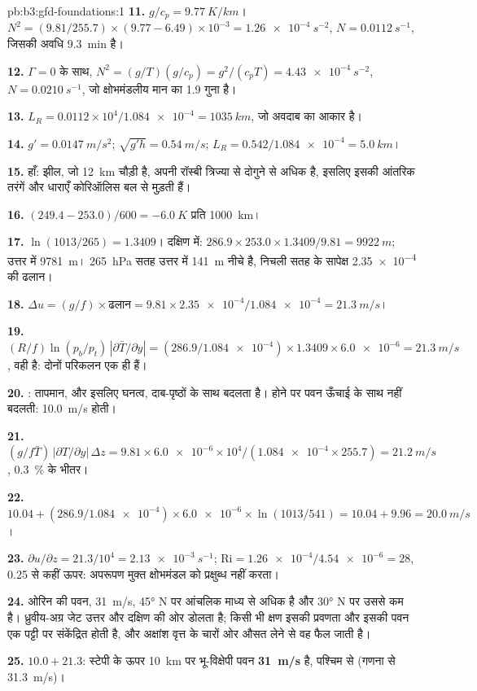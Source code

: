 \begin{solution}{pb:b3:gfd-foundations:1}
\textbf{11.} $g/c_p = \qty{9.77}{K/km}$। $N^2 = (9.81/255.7)\times(9.77 -
6.49)\times10^{-3} = \qty{1.26e-4}{s^{-2}}$, $N = \qty{0.0112}{s^{-1}}$, जिसकी
अवधि \qty{9.3}{min} है।

\textbf{12.} $\Gamma = 0$ के साथ, $N^2 = (g/T)(g/c_p) = g^2/(c_pT) =
\qty{4.43e-4}{s^{-2}}$, $N = \qty{0.0210}{s^{-1}}$, जो
क्षोभमंडलीय मान का 1.9 गुना है।

\textbf{13.} $L_R = 0.0112\times10^4/\num{1.084e-4} = \qty{1035}{km}$, जो
अवदाब का आकार है।

\textbf{14.} $g' = \qty{0.0147}{m/s^2}$; $\sqrt{g'h} = \qty{0.54}{m/s}$;
$L_R = 0.542/\num{1.084e-4} = \qty{5.0}{km}$।

\textbf{15.} हाँ: झील, जो \qty{12}{km} चौड़ी है, अपनी
रॉस्बी त्रिज्या से दोगुने से अधिक है, इसलिए इसकी आंतरिक तरंगें और धाराएँ
कोरिऑलिस बल से मुड़ती हैं।

\textbf{16.} $(249.4 - 253.0)/600 = \qty{-6.0}{K}$ प्रति \qty{1000}{km}।

\textbf{17.} $\ln(1013/265) = 1.3409$। दक्षिण में:
$286.9\times253.0\times1.3409/9.81 = \qty{9922}{m}$; उत्तर में \qty{9781}{m}।
\qty{265}{hPa} सतह उत्तर में \qty{141}{m} नीचे है, निचली सतह के सापेक्ष
\num{2.35e-4} की ढलान।

\textbf{18.} $\Delta u = (g/f)\times\text{ढलान} = 9.81\times\num{2.35e-4}/
\num{1.084e-4} = \qty{21.3}{m/s}$।

\textbf{19.} $(R/f)\ln(p_b/p_t)\,|\partial\bar T/\partial y| =
(286.9/\num{1.084e-4})\times1.3409\times\num{6.0e-6} = \qty{21.3}{m/s}$, वही
है: दोनों परिकलन एक ही हैं।

\textbf{20.} : तापमान, और इसलिए घनत्व, दाब-पृष्ठों के
साथ बदलता है।  होने पर पवन ऊँचाई के साथ नहीं बदलती:
\qty{10.0}{m/s} होती।

\textbf{21.} $(g/f\bar T)\,|\partial T/\partial y|\,\Delta z = 9.81\times
\num{6.0e-6}\times10^4/(\num{1.084e-4}\times255.7) = \qty{21.2}{m/s}$,
\qty{0.3}{\percent} के भीतर।

\textbf{22.} $10.04 + (286.9/\num{1.084e-4})\times\num{6.0e-6}\times
\ln(1013/541) = 10.04 + 9.96 = \qty{20.0}{m/s}$।

\textbf{23.} $\partial u/\partial z = 21.3/10^4 = \qty{2.13e-3}{s^{-1}}$;
$\mathrm{Ri} = \num{1.26e-4}/\num{4.54e-6} = 28$, 0.25 से कहीं ऊपर: अपरूपण
मुक्त क्षोभमंडल को प्रक्षुब्ध नहीं करता।

\textbf{24.} ओरिन की पवन, \qty{31}{m/s}, \ang{45} N पर आंचलिक माध्य से अधिक
है और \ang{30} N पर उससे कम है। ध्रुवीय-अग्र जेट उत्तर और दक्षिण की ओर डोलता है;
किसी भी क्षण इसकी प्रवणता और इसकी पवन एक पट्टी पर संकेंद्रित होती है,
और अक्षांश वृत्त के चारों ओर औसत लेने से वह फैल जाती है।

\textbf{25.} $10.0 + 21.3$: स्टेपी के ऊपर \qty{10}{km} पर भू-विक्षेपी
पवन \textbf{\qty[text-series-to-math=true]{31}{m/s}} है, पश्चिम से
(गणना से \qty{31.3}{m/s})।
\end{solution}
